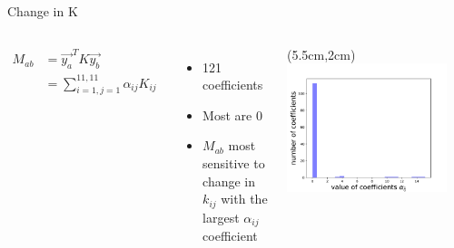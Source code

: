 \documentclass[15pt]{beamer}
\begin{document}
\begin{frame}{Change in K}
\begin{columns}
\begin{align*}
M_{ab} &= \vec{y_a}^T K \vec{y_b}\\
	   &= \sum_{i=1,j=1}^{11,11} \alpha_{ij}K_{ij}
\end{align*}

\begin{itemize}
	\item 121 coefficients
	\item Most are 0
	\item $M_{ab}$ most sensitive to change in $k_{ij}$ with the largest $\alpha_{ij}$ coefficient
\end{itemize}

	\begin{textblock*}{8cm}(5.5cm,2cm) %
	 \includegraphics[width=0.9\textwidth]{hist}
	\end{textblock*}
\end{columns}
\end{frame}
\end{document}
